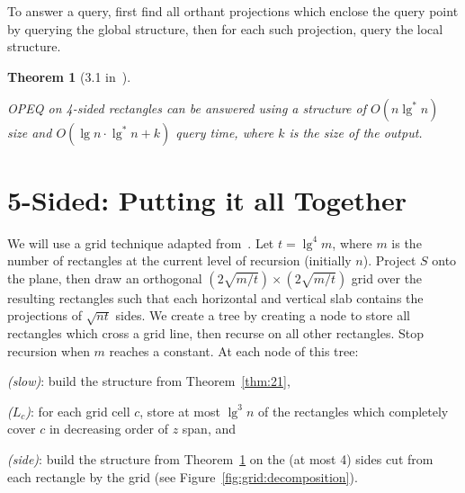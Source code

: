 \documentclass[letterpaper,12pt,twocolumn]{article}
\newcommand{\BigOh}[1]{O\!\left(#1\right)}
\theoremstyle{plain}
\newtheorem{theorem}{Theorem}
\begin{document}
To answer a query, first find all orthant projections which enclose
the query point by querying the global structure, then for each such
projection, query the local structure.

\begin{theorem}[3.1 in~\cite{saladi2015improved}]\label{thm:31}

  OPEQ on 4-sided rectangles can be answered using a structure of
  $\BigOh{n\lg^* n}$ size and $\BigOh{\lg n \cdot \lg^* n + k}$
  query time, where $k$ is the size of the output.

\end{theorem}

\section{5-Sided: Putting it all Together}

We will use a grid technique adapted from~\cite{alstrup2000new}.  Let
$t = \lg^4 m$, where $m$ is the number of rectangles at the current
level of recursion (initially $n$).  Project $S$ onto the plane, then
draw an orthogonal $(2\sqrt{m/t})\times(2\sqrt{m/t})$ grid over the
resulting rectangles such that each horizontal and vertical slab
contains the projections of $\sqrt{nt}$ sides.  We create a tree by
creating a node to store all rectangles which cross a grid line, then
recurse on all other rectangles.  Stop recursion when $m$ reaches a
constant.  At each node of this tree:
%
\begin{enumerate*}[label=(\roman*)] %
\item \emph{(slow)}: build the structure from Theorem~\ref{thm:21},
\item \emph{($L_c$)}: for each grid cell $c$, store at most $\lg^3 n$
  of the rectangles which completely cover $c$ in decreasing order of
  $z$ span, and
\item \emph{(side)}: build the structure from Theorem~\ref{thm:31} on
  the (at most 4) sides cut from each rectangle by the grid (see
  Figure~\ref{fig:grid:decomposition}).
\end{enumerate*}
\end{document}
